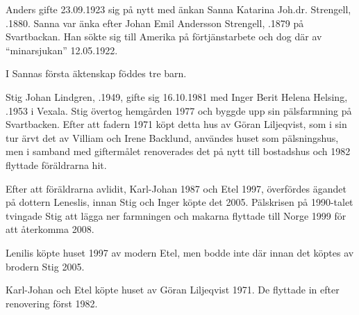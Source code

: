 Anders gifte 23.09.1923 sig på nytt med änkan Sanna Katarina Joh.dr. Strengell, .1880. Sanna var änka efter Johan Emil Andersson Strengell, .1879 på Svartbackan. Han sökte sig till Amerika på förtjänstarbete och dog där av ``minarsjukan'' 12.05.1922.

I Sannas första äktenskap föddes tre barn.
\begin{jhchildren}
  \item {}
  \item {}
  \item {}
\end{jhchildren}



%



%
Stig Johan Lindgren, .1949, gifte sig 16.10.1981 med Inger Berit Helena Helsing, .1953 i Vexala. Stig övertog hemgården 1977 och byggde upp sin pälsfarmning på Svartbacken. Efter att fadern 1971 köpt detta hus av Göran Liljeqvist, som i sin tur ärvt det av Villiam och Irene Backlund, användes huset som pälsningshus, men i samband med giftermålet renoverades det på nytt till bostadshus och 1982 flyttade föräldrarna hit.

Efter att föräldrarna avlidit, Karl-Johan 1987 och Etel 1997, överfördes ägandet på dottern Leneslis, innan Stig och Inger köpte det 2005. Pälskrisen på 1990-talet tvingade Stig att lägga ner farmningen och makarna flyttade till Norge 1999 för att återkomma 2008.


%
Lenilis köpte huset 1997 av modern Etel, men bodde inte där innan det köptes av brodern Stig 2005.\jhvspace{}


%
Karl-Johan och Etel köpte huset av Göran Liljeqvist 1971. De flyttade in efter renovering först 1982.\jhvspace{}


